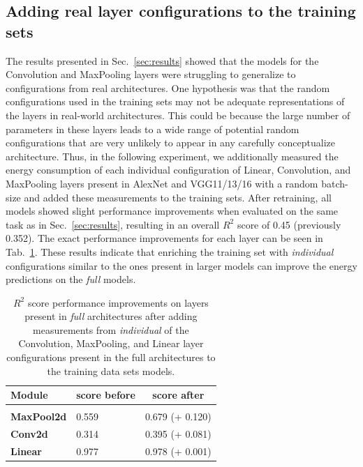 \subsection{Adding real layer configurations to the training sets}
\label{section:add-real-configs}
The results presented in Sec.~\ref{sec:results} showed that the models for the Convolution and MaxPooling layers were struggling to generalize to configurations from real architectures. One hypothesis was that the random configurations used in the training sets may not be adequate representations of the layers in real-world architectures. This could be because the large number of parameters in these layers leads to a wide range of potential random configurations that are very unlikely to appear in any carefully conceptualize architecture. Thus, in the following experiment, we additionally measured the energy consumption of each individual configuration of Linear, Convolution, and MaxPooling layers present in AlexNet and VGG11/13/16 with a random batch-size and added these measurements to the training sets. After retraining, all models showed slight performance improvements when evaluated on the same task as in Sec.~\ref{sec:results}, resulting in an overall $R^2$ score of 0.45 (previously 0.352). The exact performance improvements for each layer can be seen in Tab.~\ref{tab:improvements-from-real-configs}. These results indicate that enriching the training set with \emph{individual} configurations similar to the ones present in larger models can improve the energy predictions on the \emph{full} models.

\begin{table}[h]
    \caption{$R^2$ score performance improvements on layers present in \emph{full} architectures after adding measurements from \emph{individual} of the Convolution, MaxPooling, and Linear layer configurations present in the full architectures to the training data sets  models.}
    \label{tab:improvements-from-real-configs}
    \centering
    \begin{tabular}{l|ll}
        \multicolumn{1}{l}{\bf Module}  & \multicolumn{1}{l}{\bf score before}  & \multicolumn{1}{c}{\bf score after}
        \\ \hline \\
        \textbf{MaxPool2d} & 0.559 & 0.679 (+ 0.120) \\
        \textbf{Conv2d} & 0.314  & 0.395 (+ 0.081)\\
        \textbf{Linear} & 0.977 & 0.978 (+ 0.001) \\
    \end{tabular}
\end{table}

